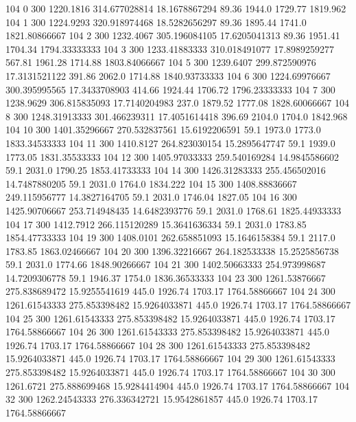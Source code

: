 104  0  300  1220.1816  314.677028814  18.1678867294  89.36  1944.0  1729.77  1819.962 
104  1  300  1224.9293  320.918974468  18.5282656297  89.36  1895.44  1741.0  1821.80866667 
104  2  300  1232.4067  305.196084105  17.6205041313  89.36  1951.41  1704.34  1794.33333333 
104  3  300  1233.41883333  310.018491077  17.8989259277  567.81  1961.28  1714.88  1803.84066667 
104  5  300  1239.6407  299.872590976  17.3131521122  391.86  2062.0  1714.88  1840.93733333 
104  6  300  1224.69976667  300.395995565  17.3433708903  414.66  1924.44  1706.72  1796.23333333 
104  7  300  1238.9629  306.815835093  17.7140204983  237.0  1879.52  1777.08  1828.60066667 
104  8  300  1248.31913333  301.466239311  17.4051614418  396.69  2104.0  1704.0  1842.968 
104  10  300  1401.35296667  270.532837561  15.6192206591  59.1  1973.0  1773.0  1833.34533333 
104  11  300  1410.8127  264.823030154  15.2895647747  59.1  1939.0  1773.05  1831.35533333 
104  12  300  1405.97033333  259.540169284  14.9845586602  59.1  2031.0  1790.25  1853.41733333 
104  14  300  1426.31283333  255.456502016  14.7487880205  59.1  2031.0  1764.0  1834.222 
104  15  300  1408.88836667  249.115956777  14.3827164705  59.1  2031.0  1746.04  1827.05 
104  16  300  1425.90706667  253.714948435  14.6482393776  59.1  2031.0  1768.61  1825.44933333 
104  17  300  1412.7912  266.115120289  15.3641636334  59.1  2031.0  1783.85  1854.47733333 
104  19  300  1408.0101  262.658851093  15.1646158384  59.1  2117.0  1783.85  1863.02466667 
104  20  300  1396.32216667  264.182533338  15.2525856738  59.1  2031.0  1774.66  1848.90266667 
104  21  300  1402.50663333  254.973998687  14.7209306778  59.1  1946.37  1754.0  1836.36533333 
104  23  300  1261.53876667  275.838689472  15.9255541619  445.0  1926.74  1703.17  1764.58866667 
104  24  300  1261.61543333  275.853398482  15.9264033871  445.0  1926.74  1703.17  1764.58866667 
104  25  300  1261.61543333  275.853398482  15.9264033871  445.0  1926.74  1703.17  1764.58866667 
104  26  300  1261.61543333  275.853398482  15.9264033871  445.0  1926.74  1703.17  1764.58866667 
104  28  300  1261.61543333  275.853398482  15.9264033871  445.0  1926.74  1703.17  1764.58866667 
104  29  300  1261.61543333  275.853398482  15.9264033871  445.0  1926.74  1703.17  1764.58866667 
104  30  300  1261.6721  275.888699468  15.9284414904  445.0  1926.74  1703.17  1764.58866667 
104  32  300  1262.24543333  276.336342721  15.9542861857  445.0  1926.74  1703.17  1764.58866667 

